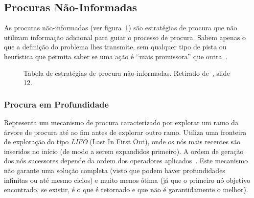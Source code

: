 \subsection{Procuras Não-Informadas}\label{subsec:procuras-nao-informadas}

As procuras não-informadas (ver figura~\ref{fig:tabela-estrategias-procura-nao-informadas}) são estratégias de procura que não utilizam informação adicional para guiar o processo de procura. Sabem apenas o que a definição do problema lhes transmite, sem qualquer tipo de pista ou heurística que permita saber se uma ação é ``mais promissora'' que outra~\cite{ist:leic:resumos:procura-cega}.

\begin{figure}[H]
    \begin{center}
    \end{center}
    \caption{Tabela de estratégias de procura não-informadas.
    Retirado de~\cite{isel:iasa:slides:proc-espaco-estados-parte-2}, slide 12.}
    \label{fig:tabela-estrategias-procura-nao-informadas}
\end{figure}

\subsubsection{Procura em Profundidade}\label{subsubsec:procura-profundidade}

Representa um mecanismo de procura caracterizado por explorar um ramo da árvore de procura até ao fim antes de explorar outro ramo.
Utiliza uma fronteira de exploração do tipo \textit{LIFO} (Last In First Out), onde os nós mais recentes são inseridos no início (de modo a serem expandidos primeiro).
A ordem de geração dos nós sucessores depende da ordem dos operadores aplicados~\cite{isel:iasa:slides:proc-espaco-estados-parte-1}.
Este mecanismo não garante uma solução completa (visto que podem haver profundidades infinitas ou até mesmo ciclos) e muito menos ótima (já que o primeiro nó objetivo encontrado, se existir, é o que é retornado e que não é garantidamente o melhor).

